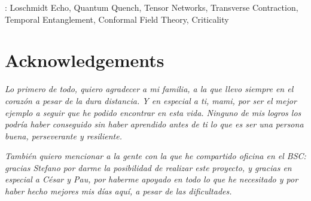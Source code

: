 \documentclass[a4paper,onecolumn,11pt,unpublished]{quantumarticle}
\begin{document}
\begin{abstract}
  The Loschmidt echo---the amplitude for a quantum state to return to itself---provides a route to the universal properties of a critical many-body system. Continued from real to imaginary time, it becomes the partition function of a conformal field theory on a strip, and its universal data---the central charge and the operator content---are encoded in the spectrum of a transfer matrix, obtained by contracting the space--time tensor network along the space direction. We apply this framework to a transverse-field Ising model extended by a next-nearest-neighbour coupling: a non-integrable chain that remains critical and in the Ising universality class over a wide range of that coupling. After a quench to the critical point, the temporal entanglement that governs the cost of the transverse contraction grows only logarithmically with the evolution time, so the method remains efficient at times where conventional evolution algorithms are limited by the entanglement barrier. We develop a translation-invariant matrix product operator, accurate to second order in the time step, that represents the time evolution of the model, and use two power methods to compute the leading eigenvectors and eigenvalues of the resulting non-Hermitian transfer matrix. Within the accessible time windows, our results are consistent with the central charge and operator content predicted by the Ising universality class.
\end{abstract}

: Loschmidt Echo, Quantum Quench, Tensor Networks, Transverse Contraction, Temporal Entanglement, Conformal Field Theory, Criticality


\clearpage

\FloatBarrier
\section*{Acknowledgements}

\emph{Lo primero de todo, quiero agradecer a mi familia, a la que llevo siempre en el corazón a pesar de la dura distancia. Y en especial a ti, mami, por ser el mejor ejemplo a seguir que he podido encontrar en esta vida. Ninguno de mis logros los podría haber conseguido sin haber aprendido antes de ti lo que es ser una persona buena, perseverante y resiliente.}

\emph{También quiero mencionar a la gente con la que he compartido oficina en el BSC: gracias Stefano por darme la posibilidad de realizar este proyecto, y gracias en especial a César y Pau, por haberme apoyado en todo lo que he necesitado y por haber hecho mejores mis días aquí, a pesar de las dificultades.}
\end{document}
